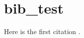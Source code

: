 \documentclass{article}
\begin{document}

\section{bib\_test}
Here is the first citation \citet[Eq.~4]{Lighthall_2010}.	    %
 



\end{document}
